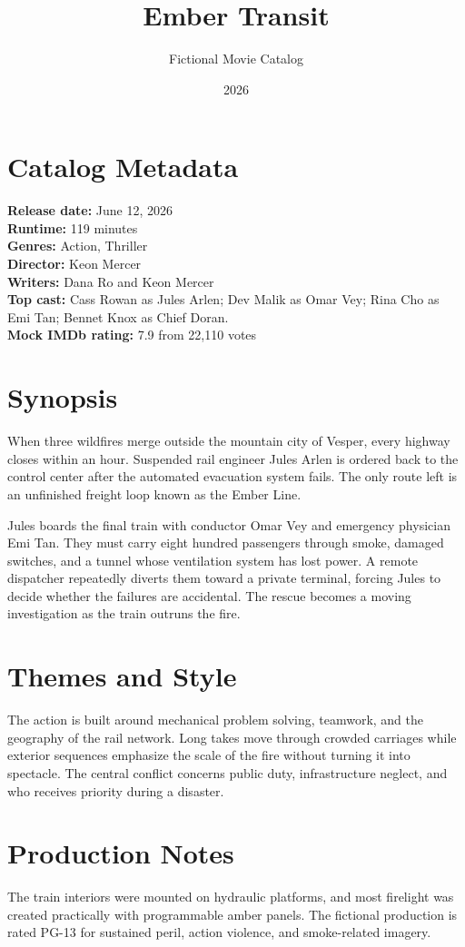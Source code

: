 \documentclass[11pt]{article}
\title{Ember Transit}
\author{Fictional Movie Catalog}
\date{2026}
\begin{document}
\maketitle

\section*{Catalog Metadata}
\textbf{Release date:} June 12, 2026\\
\textbf{Runtime:} 119 minutes\\
\textbf{Genres:} Action, Thriller\\
\textbf{Director:} Keon Mercer\\
\textbf{Writers:} Dana Ro and Keon Mercer\\
\textbf{Top cast:} Cass Rowan as Jules Arlen; Dev Malik as Omar Vey;
Rina Cho as Emi Tan; Bennet Knox as Chief Doran.\\
\textbf{Mock IMDb rating:} 7.9 from 22,110 votes

\section*{Synopsis}
When three wildfires merge outside the mountain city of Vesper, every highway
closes within an hour. Suspended rail engineer Jules Arlen is ordered back to
the control center after the automated evacuation system fails. The only route
left is an unfinished freight loop known as the Ember Line.

Jules boards the final train with conductor Omar Vey and emergency physician
Emi Tan. They must carry eight hundred passengers through smoke, damaged
switches, and a tunnel whose ventilation system has lost power. A remote
dispatcher repeatedly diverts them toward a private terminal, forcing Jules to
decide whether the failures are accidental. The rescue becomes a moving
investigation as the train outruns the fire.

\section*{Themes and Style}
The action is built around mechanical problem solving, teamwork, and the
geography of the rail network. Long takes move through crowded carriages while
exterior sequences emphasize the scale of the fire without turning it into
spectacle. The central conflict concerns public duty, infrastructure neglect,
and who receives priority during a disaster.

\section*{Production Notes}
The train interiors were mounted on hydraulic platforms, and most firelight was
created practically with programmable amber panels. The fictional production
is rated PG-13 for sustained peril, action violence, and smoke-related imagery.
\end{document}
